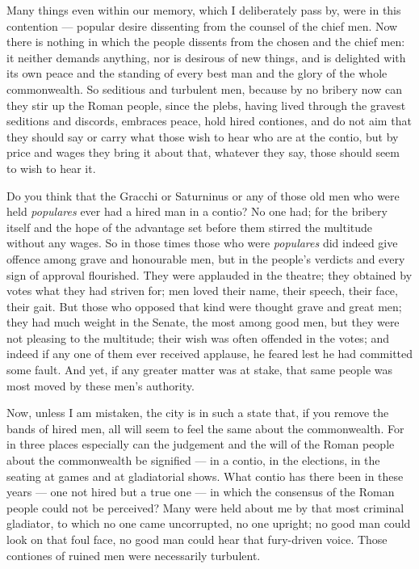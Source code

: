  Many things even within our memory, which I deliberately pass by, were in this contention --- popular desire dissenting from the counsel of the chief men. Now there is nothing in which the people dissents from the chosen and the chief men: it neither demands anything, nor is desirous of new things, and is delighted with its own peace and the standing of every best man and the glory of the whole commonwealth. So seditious and turbulent men, because by no bribery now can they stir up the Roman people, since the plebs, having lived through the gravest seditions and discords, embraces peace, hold hired contiones, and do not aim that they should say or carry what those wish to hear who are at the contio, but by price and wages they bring it about that, whatever they say, those should seem to wish to hear it.

 Do you think that the Gracchi or Saturninus or any of those old men who were held \textit{populares} ever had a hired man in a contio? No one had; for the bribery itself and the hope of the advantage set before them stirred the multitude without any wages. So in those times those who were \textit{populares} did indeed give offence among grave and honourable men, but in the people's verdicts and every sign of approval flourished. They were applauded in the theatre; they obtained by votes what they had striven for; men loved their name, their speech, their face, their gait. But those who opposed that kind were thought grave and great men; they had much weight in the Senate, the most among good men, but they were not pleasing to the multitude; their wish was often offended in the votes; and indeed if any one of them ever received applause, he feared lest he had committed some fault. And yet, if any greater matter was at stake, that same people was most moved by these men's authority.

 Now, unless I am mistaken, the city is in such a state that, if you remove the bands of hired men, all will seem to feel the same about the commonwealth. For in three places especially can the judgement and the will of the Roman people about the commonwealth be signified --- in a contio, in the elections, in the seating at games and at gladiatorial shows. What contio has there been in these years --- one not hired but a true one --- in which the consensus of the Roman people could not be perceived? Many were held about me by that most criminal gladiator, to which no one came uncorrupted, no one upright; no good man could look on that foul face, no good man could hear that fury-driven voice. Those contiones of ruined men were necessarily turbulent.


